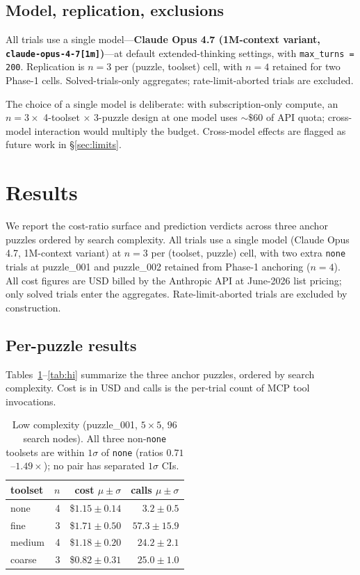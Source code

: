 \documentclass[11pt,letterpaper]{article}
\begin{document}
\subsection{Model, replication, exclusions}

All trials use a single model---\textbf{Claude Opus 4.7
(1M-context variant, \texttt{claude-opus-4-7[1m]})}---at default
extended-thinking settings, with \texttt{max\_turns = 200}.
Replication is $n = 3$ per (puzzle, toolset) cell, with $n = 4$
retained for two Phase-1 cells. Solved-trials-only aggregates;
rate-limit-aborted trials are excluded.

The choice of a single model is deliberate: with subscription-only
compute, an $n = 3 \times$ 4-toolset $\times$ 3-puzzle design at
one model uses ${\sim}\$60$ of API quota; cross-model interaction
would multiply the budget. Cross-model effects are flagged as
future work in \S\ref{sec:limits}.


\section{Results}
\label{sec:results}

We report the cost-ratio surface and prediction verdicts across
three anchor puzzles ordered by search complexity. All trials use
a single model (Claude Opus 4.7, 1M-context variant) at $n = 3$
per (toolset, puzzle) cell, with two extra \texttt{none} trials at
puzzle\_001 and puzzle\_002 retained from Phase-1 anchoring
($n = 4$). All cost figures are USD billed by the Anthropic API at
June-2026 list pricing; only solved trials enter the aggregates.
Rate-limit-aborted trials are excluded by construction.

\subsection{Per-puzzle results}
\label{subsec:per-puzzle}

Tables~\ref{tab:lo}--\ref{tab:hi} summarize the three anchor
puzzles, ordered by search complexity. Cost is in USD and calls is
the per-trial count of MCP tool invocations.

\begin{table}[h]
\centering\small
\begin{tabular}{@{}l r r r@{}}
\toprule
toolset & $n$ & cost $\mu \pm \sigma$ & calls $\mu \pm \sigma$ \\
\midrule
none   & 4 & \$$1.15 \pm 0.14$ & $3.2 \pm 0.5$ \\
fine   & 3 & \$$1.71 \pm 0.50$ & $57.3 \pm 15.9$ \\
medium & 4 & \$$1.18 \pm 0.20$ & $24.2 \pm 2.1$ \\
coarse & 3 & \$$0.82 \pm 0.31$ & $25.0 \pm 1.0$ \\
\bottomrule
\end{tabular}
\caption{Low complexity (puzzle\_001, $5 \times 5$, $96$ search
nodes). All three non-\texttt{none} toolsets are within $1\sigma$
of \texttt{none} (ratios $0.71$--$1.49\times$); no pair has
separated $1\sigma$ CIs.}
\label{tab:lo}
\end{table}
\end{document}
